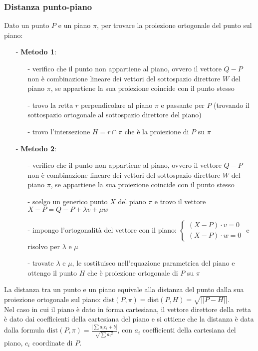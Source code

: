 \documentclass[a4paper]{article}
\newcommand\dist{\text{dist}}	%
\begin{document}
\subsubsection*{Distanza punto-piano}
Dato un punto \(P\) e un piano \(\pi\), per trovare la proiezione ortogonale del punto sul piano:
\begin{itemize}[topsep=3pt, itemsep=0pt]
	\item[-] \textbf{Metodo 1}:
	\begin{itemize}[topsep=3pt, itemsep=0pt]
		\item[-] verifico che il punto non appartiene al piano, ovvero il vettore \(Q-P\) non è combinazione lineare dei vettori
		del sottospazio direttore \(W\) del piano \(\pi\), se appartiene la sua proiezione coincide con il punto stesso
		\item[-] trovo la retta \(r\) perpendicolare al piano \(\pi\) e passante per \(P\) (trovando il sottospazio ortogonale
		al sottospazio direttore del piano)
		\item[-] trovo l'intersezione \(H = r \cap \pi\) che è la proiezione di \(P\) su \(\pi\) 
	\end{itemize}
	\item[-] \textbf{Metodo 2}:
	\begin{itemize}[topsep=3pt, itemsep=0pt]
		\item[-] verifico che il punto non appartiene al piano, ovvero il vettore \(Q-P\) non è combinazione lineare dei vettori
		del sottospazio direttore \(W\) del piano \(\pi\), se appartiene la sua proiezione coincide con il punto stesso
		\item[-] scelgo un generico punto \(X\) del piano \(\pi\) e trovo il vettore \(X-P = Q - P + \lambda v + \mu w\)
		\item[-] impongo l'ortogonalità del vettore con il piano: \(\begin{cases} (X-P) \cdot v = 0 \\ (X-P) \cdot w = 0 \end{cases}\)
		e risolvo per \(\lambda\) e \(\mu\)
		\item[-] trovate \(\lambda\) e \(\mu\), le sostituisco nell'equazione parametrica del piano e ottengo il punto \(H\) che
		è proiezione ortogonale di \(P\) su \(\pi\)
	\end{itemize}
\end{itemize}
La distanza tra un punto e un piano equivale alla distanza del punto dalla sua proiezione ortogonale sul piano:
\(\dist(P,\pi) = \dist(P,H) = \sqrt{||P-H||}\). \\
Nel caso in cui il piano è dato in forma cartesiana, il vettore direttore della retta è dato dai coefficienti della cartesiana del
piano e si ottiene che la distanza è data dalla formula \(\displaystyle \dist(P,\pi) = \frac{\left| \sum a_i c_i + b \right|}{\sqrt{\sum {a_i}^2}}\),
con \(a_i\) coefficienti della cartesiana del piano, \(c_i\) coordinate di \(P\).
\end{document}
